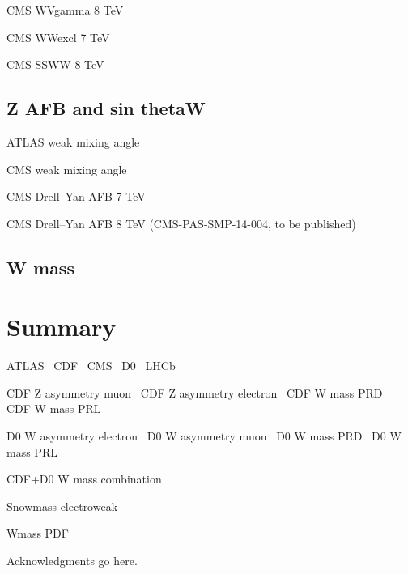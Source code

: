 \documentclass[12pt]{iopart}
\begin{document}
CMS WVgamma 8 TeV~\cite{Chatrchyan:2014bza}

CMS WWexcl 7 TeV~\cite{Chatrchyan:2013foa}

CMS SSWW 8 TeV~\cite{Khachatryan:2014sta}

\subsection{Z AFB and sin thetaW}

ATLAS weak mixing angle~\cite{Aad:2015uau}

CMS weak mixing angle~\cite{Chatrchyan:2011ya}

CMS Drell--Yan AFB 7 TeV~\cite{Chatrchyan:2012dc}

CMS Drell--Yan AFB 8 TeV (CMS-PAS-SMP-14-004, to be published)

\subsection{W mass}

\section{Summary}


ATLAS~\cite{Aad:2008zzm}
CDF~\cite{Abulencia:2005ix}
CMS~\cite{CMSdetector}
D0~\cite{Abazov:2005pn}
LHCb~\cite{Alves:2008zz}

CDF Z asymmetry muon~\cite{Aaltonen:2014loa}
CDF Z asymmetry electron~\cite{Aaltonen:2013wcp}
CDF W mass PRD~\cite{Aaltonen:2013vwa}
CDF W mass PRL~\cite{Aaltonen:2012bp}

D0 W asymmetry electron~\cite{Abazov:2013dsa}
D0 W asymmetry muon~\cite{Abazov:2013rja}
D0 W mass PRD~\cite{D0:2013jba}
D0 W mass PRL~\cite{Abazov:2012bv}

CDF+D0 W mass combination~\cite{Aaltonen:2013iut}

Snowmass electroweak~\cite{Baak:2013fwa}

Wmass PDF~\cite{Bozzi:2011ww}

\ack
Acknowledgments go here. 



\end{document}
